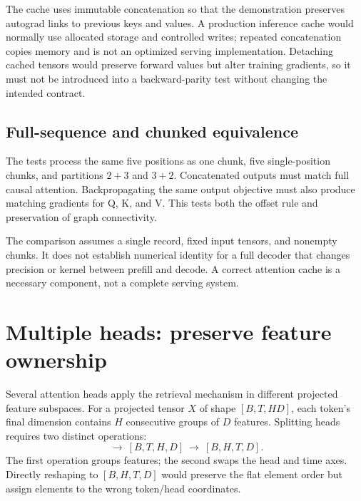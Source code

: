 
The cache uses immutable concatenation so that the demonstration preserves autograd links to previous keys and values. A production inference cache would normally use allocated storage and controlled writes; repeated concatenation copies memory and is not an optimized serving implementation. Detaching cached tensors would preserve forward values but alter training gradients, so it must not be introduced into a backward-parity test without changing the intended contract.

\subsection{Full-sequence and chunked equivalence}

The tests process the same five positions as one chunk, five single-position chunks, and partitions $2+3$ and $3+2$. Concatenated outputs must match full causal attention. Backpropagating the same output objective must also produce matching gradients for Q, K, and V. This tests both the offset rule and preservation of graph connectivity.

The comparison assumes a single record, fixed input tensors, and nonempty chunks. It does not establish numerical identity for a full decoder that changes precision or kernel between prefill and decode. A correct attention cache is a necessary component, not a complete serving system.

\section{Multiple heads: preserve feature ownership}

Several attention heads apply the retrieval mechanism in different projected feature subspaces. For a projected tensor $X$ of shape $[B,T,H D]$, each token's final dimension contains $H$ consecutive groups of $D$ features. Splitting heads requires two distinct operations:
\begin{equation}
[B,T,HD]\ \longrightarrow\ [B,T,H,D]\
\longrightarrow\ [B,H,T,D].
\end{equation}
The first operation groups features; the second swaps the head and time axes. Directly reshaping to $[B,H,T,D]$ would preserve the flat element order but assign elements to the wrong token/head coordinates.


